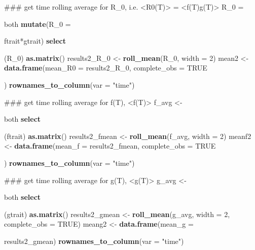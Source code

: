 \documentclass[]{article}
\newenvironment{Shaded}{\begin{snugshade}}{\end{snugshade}}
\newcommand{\KeywordTok}[1]{\textcolor[rgb]{0.13,0.29,0.53}{\textbf{{#1}}}}
\newcommand{\DataTypeTok}[1]{\textcolor[rgb]{0.13,0.29,0.53}{{#1}}}
\newcommand{\DecValTok}[1]{\textcolor[rgb]{0.00,0.00,0.81}{{#1}}}
\newcommand{\StringTok}[1]{\textcolor[rgb]{0.31,0.60,0.02}{{#1}}}
\newcommand{\OtherTok}[1]{\textcolor[rgb]{0.56,0.35,0.01}{{#1}}}
\newcommand{\NormalTok}[1]{{#1}}
\begin{document}
\begin{Shaded}
\begin{Highlighting}[]
\NormalTok{### get time rolling average for R_0, i.e. <R0(T)> =  <f(T)g(T)>}
\NormalTok{R_0 =}\StringTok{ }\NormalTok{both %>%}\StringTok{ }
\StringTok{    }\KeywordTok{mutate}\NormalTok{(}\DataTypeTok{R_0 =} \NormalTok{ftrait*gtrait) %>%}\StringTok{ }
\StringTok{    }\KeywordTok{select}\NormalTok{(R_0) %>%}\StringTok{ }
\StringTok{    }\KeywordTok{as.matrix}\NormalTok{()}
\NormalTok{results2_R_0 <-}\StringTok{ }\KeywordTok{roll_mean}\NormalTok{(R_0, }\DataTypeTok{width =} \DecValTok{2}\NormalTok{)}
\NormalTok{mean2 <-}\StringTok{ }\KeywordTok{data.frame}\NormalTok{(}\DataTypeTok{mean_R0 =} \NormalTok{results2_R_0, }\DataTypeTok{complete_obs =} \OtherTok{TRUE}\NormalTok{) %>%}\StringTok{ }
\StringTok{    }\KeywordTok{rownames_to_column}\NormalTok{(}\DataTypeTok{var =} \StringTok{"time"}\NormalTok{)}


\NormalTok{### get time rolling average for f(T), <f(T)>}
\NormalTok{f_avg <-}\StringTok{ }\NormalTok{both %>%}\StringTok{ }
\StringTok{    }\KeywordTok{select}\NormalTok{(ftrait) %>%}\StringTok{ }
\StringTok{    }\KeywordTok{as.matrix}\NormalTok{()}
\NormalTok{results2_fmean <-}\StringTok{ }\KeywordTok{roll_mean}\NormalTok{(f_avg, }\DataTypeTok{width =} \DecValTok{2}\NormalTok{)}
\NormalTok{meanf2 <-}\StringTok{ }\KeywordTok{data.frame}\NormalTok{(}\DataTypeTok{mean_f =} \NormalTok{results2_fmean, }\DataTypeTok{complete_obs =} \OtherTok{TRUE}\NormalTok{) %>%}\StringTok{ }
\StringTok{    }\KeywordTok{rownames_to_column}\NormalTok{(}\DataTypeTok{var =} \StringTok{"time"}\NormalTok{)}

\NormalTok{### get time rolling average for g(T), <g(T)>}
\NormalTok{g_avg <-}\StringTok{ }\NormalTok{both %>%}\StringTok{ }
\StringTok{    }\KeywordTok{select}\NormalTok{(gtrait) %>%}\StringTok{ }
\StringTok{    }\KeywordTok{as.matrix}\NormalTok{()}
\NormalTok{results2_gmean <-}\StringTok{ }\KeywordTok{roll_mean}\NormalTok{(g_avg, }\DataTypeTok{width =} \DecValTok{2}\NormalTok{, }\DataTypeTok{complete_obs =} \OtherTok{TRUE}\NormalTok{)}
\NormalTok{meang2 <-}\StringTok{ }\KeywordTok{data.frame}\NormalTok{(}\DataTypeTok{mean_g =} \NormalTok{results2_gmean) %>%}\StringTok{ }
\StringTok{    }\KeywordTok{rownames_to_column}\NormalTok{(}\DataTypeTok{var =} \StringTok{"time"}\NormalTok{)}


}}}}}}}}}}
\end{Highlighting}
\end{Shaded}
\end{document}
